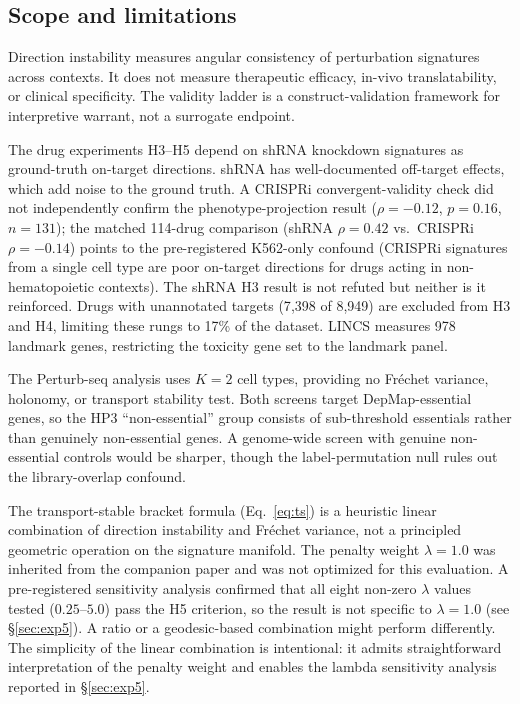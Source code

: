 \documentclass[11pt]{article}
\begin{document}
\subsection{Scope and limitations}

Direction instability measures angular consistency of perturbation signatures
across contexts. It does not measure therapeutic efficacy, in-vivo
translatability, or clinical specificity. The validity ladder is a
construct-validation framework for interpretive warrant, not a surrogate
endpoint.

The drug experiments H3--H5 depend on shRNA knockdown signatures as
ground-truth on-target directions. shRNA has well-documented off-target
effects, which add noise to the ground truth. A CRISPRi
convergent-validity check did not
independently confirm the phenotype-projection result ($\rho = -0.12$,
$p = 0.16$, $n = 131$); the matched 114-drug comparison (shRNA
$\rho = 0.42$ vs.\ CRISPRi $\rho = -0.14$) points to the
pre-registered K562-only confound (CRISPRi signatures from a single
cell type are poor on-target directions for drugs acting in
non-hematopoietic contexts). The shRNA H3 result is not refuted but
neither is it reinforced. Drugs with unannotated targets
(7{,}398 of 8{,}949) are excluded from H3 and H4, limiting these rungs
to 17\% of the dataset. LINCS measures 978 landmark genes, restricting
the toxicity gene set to the landmark panel.

The Perturb-seq analysis uses $K = 2$ cell types, providing no Fr\'echet
variance, holonomy, or transport stability test. Both screens target
DepMap-essential genes, so the HP3 ``non-essential'' group consists of
sub-threshold essentials rather than genuinely non-essential genes. A
genome-wide screen with genuine non-essential controls would be sharper,
though the label-permutation null rules out the library-overlap confound.

The transport-stable bracket formula (Eq.~\ref{eq:ts}) is a heuristic
linear combination of direction instability and Fr\'echet variance, not a
principled geometric operation on the signature manifold. The penalty
weight $\lambda = 1.0$ was inherited from the companion paper
\citep{tower2026drug} and was not optimized for this evaluation. A
pre-registered sensitivity analysis confirmed that all eight non-zero
$\lambda$ values tested ($0.25$--$5.0$) pass the H5 criterion, so the
result is not specific to $\lambda = 1.0$ (see \S\ref{sec:exp5}).
A ratio or a geodesic-based combination might perform differently.
The simplicity of the linear combination is intentional: it admits
straightforward interpretation of the penalty weight and enables the
lambda sensitivity analysis reported in \S\ref{sec:exp5}.
\end{document}
